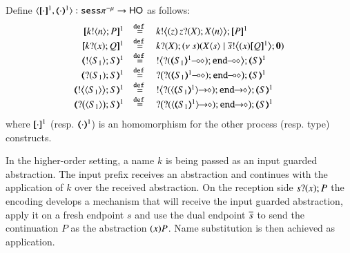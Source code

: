 \begin{definition}
    Define $\encod{\cdot}{\cdot}{1}: \sespnr \to \HO$  as follows:
\[
	\begin{array}{rcl}
		\pmap{\bout{k}{n} P}{1}	&\defeq&	\bbout{k}{ \abs{z}{\,\binp{z}{X} \appl{X}{n}} } \pmap{P}{1} \\
		\pmap{\binp{k}{x} Q}{1}	&\defeq&	\binp{k}{X} \newsp{s}{\appl{X}{s} \Par \bbout{\dual{s}}{\abs{x} \pmap{Q}{1}} \inact} \\
		\tmap{\btout{S_1} {S} }{1}	&\defeq&	\bbtout{\lhot{\btinp{\lhot{\tmap{S_1}{1}}}\tinact}} \tmap{S}{1}  \\
		\tmap{\btinp{S_1} S }{1}	&\defeq&	\bbtinp{\lhot{\btinp{\lhot{\tmap{S_1}{1}}}\tinact}} \tmap{S}{1} \\
		\tmap{\bbtout{\chtype{S_1}} {S} }{1}	&\defeq&	\bbtout{\shot{\btinp{\shot{\chtype{\tmap{S_1}{1}}}}\tinact}} \tmap{S}{1}  \\
		\tmap{\bbtinp{\chtype{S_1}} {S} }{1}	&\defeq&	\bbtinp{\shot{\btinp{\shot{\chtype{\tmap{S_1}{1}}}}\tinact}} \tmap{S}{1} 
	\end{array}
\]
where $[\!\![\cdot]\!\!]^1$ (resp. $(\!\!\langle\cdot\rangle\!\!)^1$) is an 
homomorphism for the other process (resp. type) constructs.
\end{definition}

In the higher-order setting, a name $k$ is being passed as an input
guarded abstraction. The input prefix receives an abstraction and
continues with the application of $k$ over the received abstraction.
On the reception side $s ? (x) ; P$ 
the encoding develops a mechanism that will receive
the input guarded abstraction, apply it on a fresh endpoint $s$ and use
the dual endpoint $\overline{s}$ to send the continuation $P$ as the abstraction
$(x)P$. Name substitution is then achieved as application.

